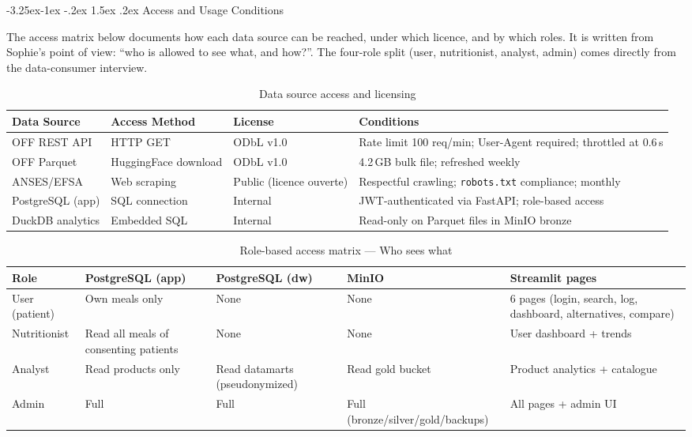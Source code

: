 \documentclass[a4paper,11pt,oneside,openany]{report}
\makeatletter
\renewcommand\subsubsection{\@startsection{subsubsection}{3}{\z@}%
  {-3.25ex\@plus -1ex \@minus -.2ex}%
  {1.5ex \@plus .2ex}%
  {\normalfont\normalsize\bfseries\color{ntblue}}}
\makeatother
\begin{document}
\subsubsection{Access and Usage Conditions}

The access matrix below documents how each data source can be
reached, under which licence, and by which roles. It is written
from Sophie's point of view: ``who is allowed to see what, and
how?''. The four-role split (user, nutritionist, analyst, admin)
comes directly from the data-consumer interview.

\begin{table}[H]
\centering
\caption{Data source access and licensing}
\label{tab:access-conditions}
\begin{tabularx}{\textwidth}{L{2.5cm} L{2.5cm} L{3cm} L{4.5cm}}
\toprule
\textbf{Data Source} & \textbf{Access Method} & \textbf{License} & \textbf{Conditions} \\
\midrule
OFF REST API & HTTP GET & ODbL v1.0 & Rate limit 100 req/min; User-Agent required; throttled at 0.6\,s \\
OFF Parquet & HuggingFace download & ODbL v1.0 & 4.2\,GB bulk file; refreshed weekly \\
ANSES/EFSA & Web scraping & Public (licence ouverte) & Respectful crawling; \texttt{robots.txt} compliance; monthly \\
PostgreSQL (app) & SQL connection & Internal & JWT-authenticated via FastAPI; role-based access \\
DuckDB analytics & Embedded SQL & Internal & Read-only on Parquet files in MinIO bronze \\
\bottomrule
\end{tabularx}
\end{table}

\begin{table}[H]
\centering
\caption{Role-based access matrix --- Who sees what}
\label{tab:rbac-matrix}
\begin{tabularx}{\textwidth}{L{2.3cm} L{2.8cm} L{2.8cm} L{2.8cm} L{2.3cm}}
\toprule
\textbf{Role} & \textbf{PostgreSQL (app)} & \textbf{PostgreSQL (dw)} & \textbf{MinIO} & \textbf{Streamlit pages} \\
\midrule
User (patient) & Own meals only & None & None & 6 pages (login, search, log, dashboard, alternatives, compare) \\
Nutritionist & Read all meals of consenting patients & None & None & User dashboard + trends \\
Analyst & Read products only & Read datamarts (pseudonymized) & Read gold bucket & Product analytics + catalogue \\
Admin & Full & Full & Full (bronze/silver/gold/backups) & All pages + admin UI \\
\bottomrule
\end{tabularx}
\end{table}
\end{document}
